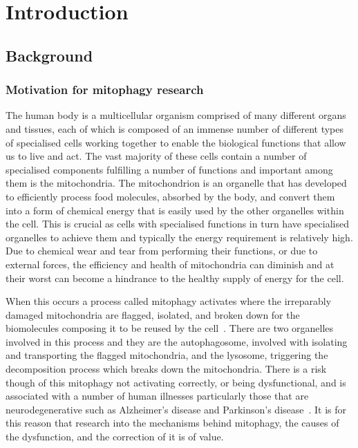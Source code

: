 \chapter{Introduction}
\label{chp:Intro}


\section{Background}\label{sec:background}
\subsection{Motivation for mitophagy research}
The human body is a multicellular organism comprised of many different organs and tissues, each of which is composed of an immense number of different types of specialised cells working together to enable the biological functions that allow us to live and act. The vast majority of these cells contain a number of specialised components fulfilling a number of functions and important among them is the mitochondria. The mitochondrion is an organelle that has developed to efficiently process food molecules, absorbed by the body, and convert them into a form of chemical energy that is easily used by the other organelles within the cell. This is crucial as cells with specialised functions in turn have specialised organelles to achieve them and typically the energy requirement is relatively high. Due to chemical wear and tear from performing their functions, or due to external forces, the efficiency and health of mitochondria can diminish and at their worst can become a hindrance to the healthy supply of energy for the cell.\par When this occurs a process called mitophagy activates where the irreparably damaged mitochondria are flagged, isolated, and broken down for the biomolecules composing it to be reused by the cell~\cite{cell_phys_book}. There are two organelles involved in this process and they are the autophagosome, involved with isolating and transporting the flagged mitochondria, and the lysosome, triggering the decomposition process which breaks down the mitochondria. There is a risk though of this mitophagy not activating correctly, or being dysfunctional, and is associated with a number of human illnesses particularly those that are neurodegenerative such as Alzheimer's disease and Parkinson's disease~\cite{mito_diseases}. It is for this reason that research into the mechanisms behind mitophagy, the causes of the dysfunction, and the correction of it is of value.

